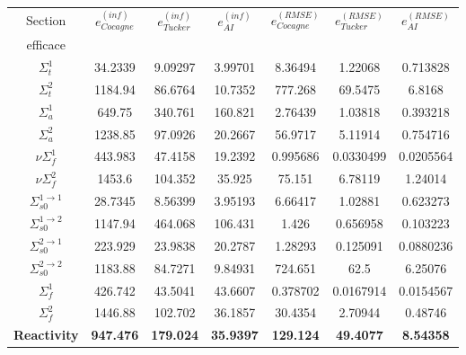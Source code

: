 \begin{center}
\begin{table}[!h]
\begin{tabular}{|c||c|c|c||c|c|c|}
		\hline
		Section 													& $e_{Cocagne}^{(inf)}$			& $e_{Tucker}^{(inf)}$			&	$e_{AI}^{(inf)}$			&	$e_{Cocagne}^{(RMSE)}$			& $e_{Tucker}^{(RMSE)}$			&	$e_{AI}^{(RMSE)}$			\\
		efficace													&	&	&	&	&	&	\\
		\hline
		$\Sigma_t^1$											&	34.2339&	9.09297&	3.99701&	8.36494&	1.22068&	0.713828 \\
		\hline
		$\Sigma_t^2$											& 1184.94&	86.6764&	10.7352&	777.268&	69.5475&	6.8168 \\
		\hline
		$\Sigma_a^1$											& 649.75&	340.761&	160.821&	2.76439&	1.03818&	0.393218 \\
		\hline
		$\Sigma_a^2$											& 1238.85&	97.0926&	20.2667&	56.9717&	5.11914&	0.754716 \\
		\hline
		$\nu\Sigma_f^1$										& 443.983&	47.4158&	19.2392&	0.995686&	0.0330499&	0.0205564 \\
		\hline
		$\nu\Sigma_f^2$										& 1453.6&	104.352&	35.925&	75.151&	6.78119&	1.24014 \\
		\hline
		$\Sigma_{s0}^{1\rightarrow1}$			& 28.7345&	8.56399&	3.95193&	6.66417&	1.02881&	0.623273 \\
		\hline
		$\Sigma_{s0}^{1\rightarrow2}$			& 1147.94&	464.068&	106.431&	1.426&	0.656958&	0.103223 \\
		\hline
		$\Sigma_{s0}^{2\rightarrow1}$			& 223.929&	23.9838&	20.2787&	1.28293&	0.125091&	0.0880236 \\
		\hline
		$\Sigma_{s0}^{2\rightarrow2}$			& 1183.88&	84.7271&	9.84931&	724.651&	62.5&	6.25076 \\
		\hline
		$\Sigma_f^1$											& 426.742&	43.5041&	43.6607&	0.378702&	0.0167914&	0.0154567 \\
		\hline
		$\Sigma_f^2$											& 1446.88&	102.702&	36.1857&	30.4354&	2.70944&	0.48746 \\
		\hline
		\textbf{Reactivity}								& \textbf{947.476}&	\textbf{179.024}&	\textbf{35.9397}&	\textbf{129.124}&	\textbf{49.4077}&	\textbf{8.54358} \\
		\hline
\end{tabular}
\end{table}



\end{center}
